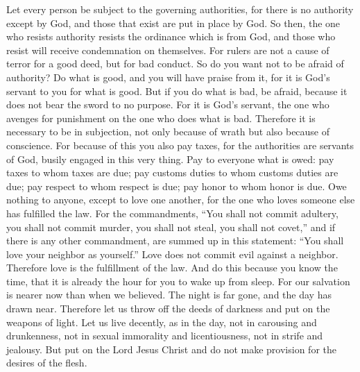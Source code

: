 \begin{biblechapter} %
 Let every person be subject to the governing authorities, for there is no authority except by God, and those that exist are put in place by God.
\verse So then, the one who resists authority resists the ordinance which is from God, and those who resist will receive condemnation on themselves.
\verse For rulers are not a cause of terror for a good deed, but for bad conduct. So do you want not to be afraid of authority? Do what is good, and you will have praise from it,
\verse for it is God’s servant to you for what is good. But if you do what is bad, be afraid, because it does not bear the sword to no purpose. For it is God’s servant, the one who avenges for punishment on the one who does what is bad.
\verse Therefore it is necessary to be in subjection, not only because of wrath but also because of conscience.
\verse For because of this you also pay taxes, for the authorities are servants of God, busily engaged in this very thing.
\verse Pay to everyone what is owed: pay taxes to whom taxes are due; pay customs duties to whom customs duties are due; pay respect to whom respect is due; pay honor to whom honor is due.
 Owe nothing to anyone, except to love one another, for the one who loves someone else has fulfilled the law.
\verse For the commandments, “You shall not commit adultery, you shall not commit murder, you shall not steal, you shall not covet,” and if there is any other commandment, are summed up in this statement: “You shall love your neighbor as yourself.”
\verse Love does not commit evil against a neighbor. Therefore love is the fulfillment of the law.
\verse And do this because you know the time, that it is already the hour for you to wake up from sleep. For our salvation is nearer now than when we believed.
\verse The night is far gone, and the day has drawn near. Therefore let us throw off the deeds of darkness and put on the weapons of light.
\verse Let us live decently, as in the day, not in carousing and drunkenness, not in sexual immorality and licentiousness, not in strife and jealousy.
\verse But put on the Lord Jesus Christ and do not make provision for the desires of the flesh.
\end{biblechapter}

